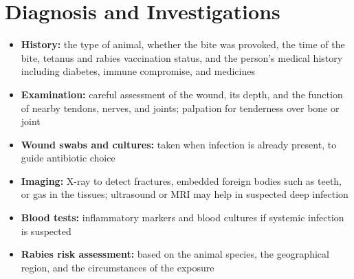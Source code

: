 \section*{Diagnosis and Investigations}
\begin{itemize}
    \item \textbf{History:} the type of animal, whether the bite was provoked, the time of the bite, tetanus and rabies vaccination status, and the person's medical history including diabetes, immune compromise, and medicines
    \item \textbf{Examination:} careful assessment of the wound, its depth, and the function of nearby tendons, nerves, and joints; palpation for tenderness over bone or joint
    \item \textbf{Wound swabs and cultures:} taken when infection is already present, to guide antibiotic choice
    \item \textbf{Imaging:} X-ray to detect fractures, embedded foreign bodies such as teeth, or gas in the tissues; ultrasound or MRI may help in suspected deep infection
    \item \textbf{Blood tests:} inflammatory markers and blood cultures if systemic infection is suspected
    \item \textbf{Rabies risk assessment:} based on the animal species, the geographical region, and the circumstances of the exposure
\end{itemize}

